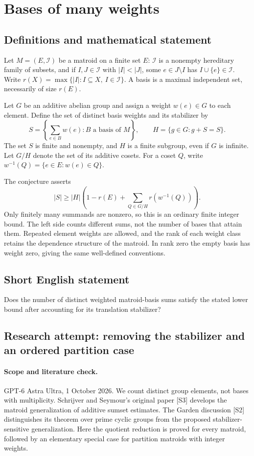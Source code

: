 \documentclass[11pt,a4paper]{article}
\begin{document}
\section*{Bases of many weights}\label{statement}

\subsection{Definitions and mathematical statement}
Let $M=(E,\mathcal I)$ be a matroid on a finite set $E$: $\mathcal I$ is
a nonempty hereditary family of subsets, and if $I,J\in\mathcal I$ with
$|I|<|J|$, some $e\in J\setminus I$ has $I\cup\{e\}\in\mathcal I$.
Write $r(X)=\max\{|I|:I\subseteq X,\ I\in\mathcal I\}$.
A basis is a maximal independent set, necessarily of size $r(E)$.

Let $G$ be an additive abelian group and assign a weight $w(e)\in G$
to each element. Define the set of distinct basis weights and its stabilizer by
\[
 S=\left\{\sum_{e\in B}w(e):B\text{ a basis of }M\right\},\qquad
 H=\{g\in G:g+S=S\}.
\]
The set $S$ is finite and nonempty, and $H$ is a finite subgroup, even
if $G$ is infinite. Let $G/H$ denote the set of its additive cosets.
For a coset $Q$, write $w^{-1}(Q)=\{e\in E:w(e)\in Q\}$.

The conjecture asserts
\[
 |S|\ge |H|\left(1-r(E)+
                 \sum_{Q\in G/H}r(w^{-1}(Q))\right).
\]
Only finitely many summands are nonzero, so this is an ordinary finite
integer bound. The left side counts different sums, not the number of
bases that attain them. Repeated element weights are allowed, and the
rank of each weight class retains the dependence structure of the
matroid. In rank zero the empty basis has weight zero, giving the same
well-defined conventions.
\subsection{Short English statement}
Does the number of distinct weighted matroid-basis sums satisfy the stated lower bound after accounting for its translation stabilizer?
\subsection{Research attempt: removing the stabilizer and an ordered partition case}
\paragraph{Scope and literature check.}
GPT-6 Astra Ultra, 1 October 2026. We count distinct group elements,
not bases with multiplicity. Schrijver and Seymour's original paper
[S3] develops the matroid generalization of additive sumset estimates.
The Garden discussion [S2] distinguishes its theorem over prime cyclic
groups from the proposed stabilizer-sensitive generalization. Here the
quotient reduction is proved for every matroid, followed by an elementary
special case for partition matroids with integer weights.
\end{document}
